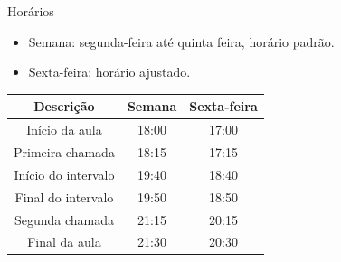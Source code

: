 
\begin{frame}{Horários}
    \begin{itemize}
        \item Semana: segunda-feira até quinta feira, horário padrão.
        \item Sexta-feira: horário ajustado.
    \end{itemize}

    \vspace{1.0cm}
    \centering
    \begin{tabular}{|c|c|c|}
        \hline
        Descrição & Semana & Sexta-feira \\
        \hline
        Início da aula   & 18:00   & 17:00   \\
        Primeira chamada   & 18:15   & 17:15   \\
        Início do intervalo  & 19:40   & 18:40   \\
        Final do intervalo   & 19:50   & 18:50   \\
        Segunda chamada   & 21:15   & 20:15   \\
        Final da aula   & 21:30   & 20:30   \\
        \hline
    \end{tabular}
\end{frame}